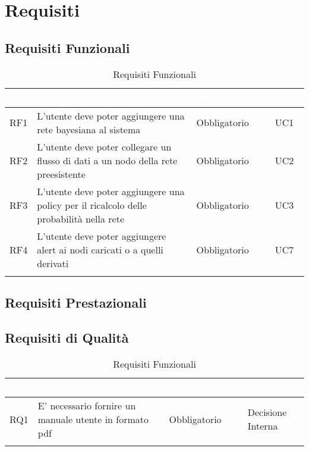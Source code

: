 \section{Requisiti}\label{Requisiti}

\subsection{Requisiti Funzionali}\label{RF}
\begin{center}
\begin{longtable}[c]{|m{}|m{}|m{}|m{}|}
\hline
\rowcolor{bluelogo}\textbf{\textcolor{white}{ID}} & \textbf{\textcolor{white}{Descrizione}} & \textbf{\textcolor{white}{Obbligatorietà}} & \textbf{\textcolor{white}{Fonti}}\\
\hline \hline
\endfirsthead
RF1 & L'utente deve poter aggiungere una rete bayesiana al sistema & Obbligatorio & UC1\\
\hline
\rowcolor{grigio}RF2 & L'utente deve poter collegare un flusso di dati a un nodo della rete preesistente & Obbligatorio & UC2\\
\hline
RF3 & L'utente deve poter aggiungere una policy per il ricalcolo delle probabilità nella rete & Obbligatorio & UC3\\
\hline
\rowcolor{grigio}RF4 & L'utente deve poter aggiungere alert ai nodi caricati o a quelli derivati & Obbligatorio & UC7\\ 
\hline
\caption{Requisiti Funzionali}
\end{longtable}
\end{center}

\subsection{Requisiti Prestazionali}\label{RP}

\subsection{Requisiti di Qualità}\label{RQ}
\begin{center}
\begin{longtable}[c]{|m{}|m{}|m{}|m{}|}
\hline
\rowcolor{bluelogo}\textbf{\textcolor{white}{ID}} & \textbf{\textcolor{white}{Descrizione}} & \textbf{\textcolor{white}{Obbligatorietà}} & \textbf{\textcolor{white}{Fonti}}\\
\hline \hline
\endfirsthead
RQ1 & E' necessario fornire un manuale utente in formato pdf & Obbligatorio & Decisione Interna\\
\hline
\caption{Requisiti Funzionali}
\end{longtable}
\end{center}

